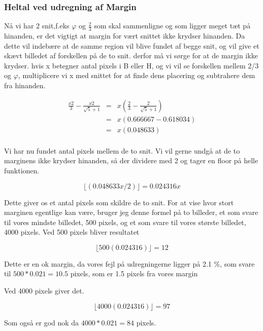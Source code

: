 \subsubsection{Heltal ved udregning af Margin}
Nå vi har 2 snit,f.eks $\varphi$ og $\frac{2}{3}$ som skal sammenligne og
som ligger meget tæt på hinanden, er det vigtigt at margin for vært
snittet ikke krydser hinanden. Da dette vil indebære at de samme region
vil blive fundet af begge snit, og vil give et skævt billedet af
forskellen på de to snit. derfor må vi sørge for at de margin ikke
krydser. hvis x betegner antal pixels i B eller H, og vi vil se
forskellen mellem 2/3 og $\varphi$, multiplicere vi x med snittet for at
finde dens placering og subtrahere dem fra hinanden.

\begin{eqnarray}
	\frac{x2}{3}-\frac{x2}{\sqrt{5}+1} &=& x(\frac{2}{3}-\frac{2}{\sqrt{5}+1}) \\ \nonumber
	&=& x(0.666667-0.618034) \\ \nonumber
	&=& x(0.048633) \\
\end{eqnarray}

Vi har nu fundet antal pixels mellem de to snit. Vi vil gerne undgå at
de to marginens ikke krydser hinanden, så der dividere med 2 og tager en
floor på helle funktionen.

\begin{equation}
	\lfloor(0.048633x/2)\rfloor = 0.024316x
\end{equation}

Dette giver os et antal pixels som skildre de to snit. For at vise
hvor stort marginen egentlige kan være, bruger jeg denne formel på to
billeder, et som svare til vores mindste billedet, 500 pixels, og et
som svare til vores største billedet, 4000 pixels. Ved 500 pixels
bliver resultatet

\begin{equation}
	 \lfloor 500(0.024316)\rfloor = 12
\end{equation}

Dette er en ok margin, da vores fejl på udregningerne ligger på 2.1 \%,
som svare til $500*0.021 = 10.5$ pixels, som er 1.5 pixels fra vores
margin

Ved 4000 pixels giver det.

\begin{equation}
	 \lfloor 4000(0.024316)\rfloor = 97
\end{equation}

Som også er god nok da $4000*0.021 = 84$ pixels.
